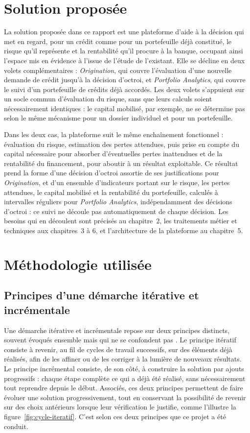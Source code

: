 \section{Solution proposée}

La solution proposée dans ce rapport est une plateforme d'aide à la décision qui met en regard, pour un crédit comme pour un portefeuille déjà constitué, le risque qu'il représente et la rentabilité qu'il procure à la banque, occupant ainsi l'espace mis en évidence à l'issue de l'étude de l'existant. Elle se décline en deux volets complémentaires : \emph{Origination}, qui couvre l'évaluation d'une nouvelle demande de crédit jusqu'à la décision d'octroi, et \emph{Portfolio Analytics}, qui couvre le suivi d'un portefeuille de crédits déjà accordés. Les deux volets s'appuient sur un socle commun d'évaluation du risque, sans que leurs calculs soient nécessairement identiques : le capital mobilisé, par exemple, ne se détermine pas selon le même mécanisme pour un dossier individuel et pour un portefeuille.

Dans les deux cas, la plateforme suit le même enchaînement fonctionnel : évaluation du risque, estimation des pertes attendues, puis prise en compte du capital nécessaire pour absorber d'éventuelles pertes inattendues et de la rentabilité du financement, pour aboutir à un résultat exploitable. Ce résultat prend la forme d'une décision d'octroi assortie de ses justifications pour \emph{Origination}, et d'un ensemble d'indicateurs portant sur le risque, les pertes attendues, le capital mobilisé et la rentabilité du portefeuille, calculés à intervalles réguliers pour \emph{Portfolio Analytics}, indépendamment des décisions d'octroi : ce suivi ne découle pas automatiquement de chaque décision. Les besoins qui en découlent sont précisés au chapitre~2, les traitements métier et techniques aux chapitres~3 à 6, et l'architecture de la plateforme au chapitre~5.

\section{Méthodologie utilisée}

\subsection{Principes d'une démarche itérative et incrémentale}

Une démarche itérative et incrémentale repose sur deux principes distincts, souvent évoqués ensemble mais qui ne se confondent pas \parencite{LarmanBasili2003}. Le principe itératif consiste à revenir, au fil de cycles de travail successifs, sur des éléments déjà réalisés, afin de les affiner ou de les corriger à la lumière de nouveaux résultats. Le principe incrémental consiste, de son côté, à construire la solution par ajouts progressifs : chaque étape complète ce qui a déjà été réalisé, sans nécessairement tout reprendre depuis le début. Associés, ces deux principes permettent de faire évoluer une solution progressivement, tout en conservant la possibilité de revenir sur des choix antérieurs lorsque leur vérification le justifie, comme l'illustre la figure~\ref{fig:cycle-iteratif}. C'est selon ces deux principes que ce projet a été conduit.

